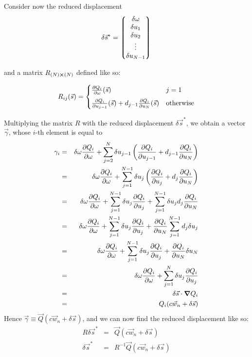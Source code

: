 \documentclass[12pt]{article}
\begin{document}
  Consider now the reduced displacement
  $$\delta \vec{s}^*=\mqty*(\delta \omega \\ \delta u_1 \\ \delta u_2 \\ \vdots \\ \delta u_{N-1})$$
  
  and a matrix $R_{(N)\cross (N)}$ defined like so:
  
  $$R_{ij}(\vec{s}) = \begin{cases}
  
	\pdv{Q_i}{\omega}()(\vec{s}) & j = 1 \\[5pt]
     
    \pdv{Q_i}{u_{j-1}}()(\vec{s}) + d_{j-1} \pdv{Q_i}{u_N}()(\vec{s}) & \mbox{otherwise}
  
  \end{cases}$$
  
  Multiplying the matrix $R$ with the reduced displacement $\delta \vec{s}^*$, we obtain a vector $\vec{\gamma}$, whose $i$-th element is equal to
  \begin{eqnarray*}
  \gamma_i&=&\delta \omega\pdv{Q_i}{\omega} + \sum_{j = 2}^N \delta u_{j-1} \left( \pdv{Q_i}{u_{j-1}} + d_{j-1} \pdv{Q_i}{u_N} \right)\\
  &=&\delta \omega\pdv{Q_i}{\omega} + \sum_{j = 1}^{N-1} \delta u_j \left( \pdv{Q_i}{u_j} + d_j \pdv{Q_i}{u_N} \right)\\
  &=&\delta \omega\pdv{Q_i}{\omega} + \sum_{j = 1}^{N-1} \delta u_j \pdv{Q_i}{u_j} + \sum_{j = 1}^{N-1} \delta u_j d_j \pdv{Q_i}{u_N}\\
  &=&\delta \omega\pdv{Q_i}{\omega} + \sum_{j = 1}^{N-1} \delta u_j \pdv{Q_i}{u_j} + \pdv{Q_i}{u_N} \sum_{j = 1}^{N-1} d_j  \delta u_j\\
  &=&\delta \omega\pdv{Q_i}{\omega} + \sum_{j = 1}^{N-1} \delta u_j \pdv{Q_i}{u_j} + \pdv{Q_i}{u_N} \delta u_N\\
  &=&\delta \omega\pdv{Q_i}{\omega} + \sum_{j = 1}^{N} \delta u_j \pdv{Q_i}{u_j}\\
  &=& \delta \vec{s}\cdot \grad{Q_i}\\
  &=& Q_i(c\vec{w}_n + \delta\vec{s})
  \end{eqnarray*}
  Hence $\vec{\gamma} \equiv \vec{Q}(c\vec{w}_n + \delta\vec{s})$, and we can now find the reduced displacement like so:
  \begin{eqnarray*}
  R\delta \vec{s}^* &=& \vec{Q}(c\vec{w}_n + \delta\vec{s})\\
  \delta \vec{s}^* &=& R^{-1} \vec{Q}(c\vec{w}_n + \delta\vec{s})
  \end{eqnarray*}
	
\end{document}
